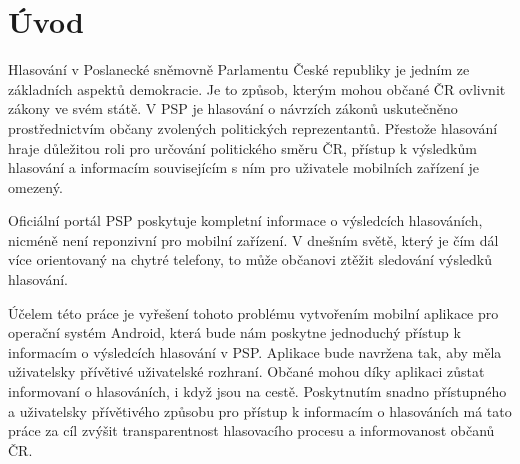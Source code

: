 \chapter*{Úvod}

Hlasování v Poslanecké sněmovně Parlamentu České republiky je jedním ze základních aspektů demokracie. Je to způsob, kterým mohou občané ČR ovlivnit zákony ve svém státě. V PSP je hlasování o návrzích zákonů uskutečněno prostřednictvím občany zvolených politických reprezentantů. Přestože hlasování hraje důležitou roli pro určování politického směru ČR, přístup \linebreak k výsledkům hlasování a informacím souvisejícím s ním pro uživatele mobilních zařízení je omezený.

Oficiální portál PSP poskytuje kompletní informace o výsledcích hlasováních, nicméně není reponzivní pro mobilní zařízení. V dnešním světě, který je čím dál více orientovaný na chytré telefony, to může občanovi ztěžit sledování výsledků hlasování.

Účelem této práce je vyřešení tohoto problému vytvořením mobilní aplikace pro operační systém Android, která bude nám poskytne jednoduchý přístup k informacím o výsledcích hlasování v PSP. Aplikace bude navržena tak, aby měla uživatelsky přívětivé uživatelské rozhraní. Občané mohou díky aplikaci zůstat informovaní o hlasováních, i když jsou na cestě. Poskytnutím snadno přístupného a uživatelsky přívětivého způsobu pro přístup k informacím o hlasováních má tato práce za cíl zvýšit transparentnost hlasovacího procesu a informovanost občanů ČR.